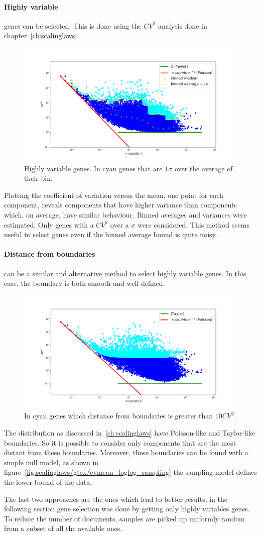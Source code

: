 \paragraph{Highly variable} genes can be selected. This is done using the $CV^2$ analysis done in chapter~\ref{ch:scalinglaws}.
\begin{figure}[htb!]
    \centering
    \includegraphics[width=0.8\linewidth]{pictures/topic/cvmean_oversigma.png}
    \caption{Highly variable genes. In cyan genes that are $1 \sigma$ over the average of their bin.}
    \label{fig:topic/cvmean_oversigma}
\end{figure}
Plotting the coefficient of variation versus the mean, one point for each component, reveals components that have higher variance than components which, on average, have similar behaviour. Binned averages and variances were estimated. Only genes with a $CV^2$ over a $\sigma$ were considered. This method seems useful to select genes even if the binned average bound is quite noisy.

\paragraph{Distance from boundaries} can be a similar and alternative method to select highly variable genes. In this case, the boundary is both smooth and well-defined.
\begin{figure}[htb!]
    \centering
    \includegraphics[width=0.8\linewidth]{pictures/topic/cvmean_oversampling.png}
    \caption{In cyan genes which distance from boundaries is greater than $10 CV^2$.}
    \label{fig:topic/cvmean_oversampling}
\end{figure}
The distribution as discussed in~\ref{ch:scalinglaws} have Poisson-like and Taylor-like boundaries. So it is possible to consider only components that are the most distant from these boundaries. Moreover, these boundaries can be found with a simple null model, as shown in figure~\ref{fig:scalinglaws/gtex/cvmean_loglog_sampling} the sampling model defines the lower bound of the data.

The last two approaches are the ones which lead to better results, in the following section gene selection was done by getting only highly variables genes.
To reduce the number of documents, samples are picked up uniformly random from a subset of all the available ones.